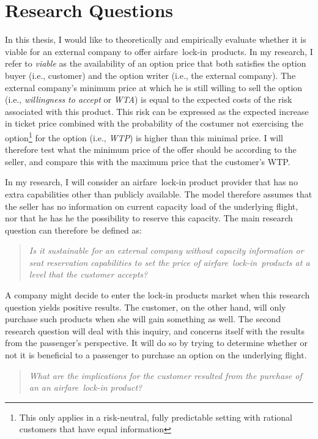 \chapter{Research Questions}
\label{chap:ResearchQuestions}
In this thesis, I would like to theoretically and empirically evaluate whether it is viable for an external company to offer airfare~lock-in~products. In my research, I refer to \emph{viable} as the availability of an option price that both satisfies the option buyer (i.e., customer) and the option writer (i.e., the external company). The external company's minimum price at which he is still willing to sell the option (i.e., \emph{willingness to accept} or \emph{WTA}) is equal to the expected costs of the risk associated with this product. This risk can be expressed as the expected increase in ticket price combined with the probability of the costumer not exercising the option\footnote{This only applies in a risk-neutral, fully predictable setting with rational customers that have equal information} for the option (i.e., \emph{WTP}) is higher than this minimal price. I will therefore test what the minimum price of the offer should be according to the seller, and compare this with the maximum price that the customer's WTP.

In my research, I will consider an airfare~lock-in product provider that has no extra capabilities other than publicly available. The model therefore assumes that the seller has no information on current capacity load of the underlying flight, nor that he has he the possibility to reserve this capacity. The main research question can therefore be defined as:

\begin{quote}\emph{Is it sustainable for an external company without capacity information or seat reservation capabilities to set the price of airfare~lock-in~products at a level that the customer accepts?}\end{quote}

A company might decide to enter the lock-in products market when this research question yields positive results. The customer, on the other hand, will only purchase such products when she will gain something as well. The second research question will deal with this inquiry, and concerns itself with the results from the passenger's perspective. It will do so by trying to determine whether or not it is beneficial to a passenger to purchase an option on the underlying flight.

\begin{quote}\emph{What are the implications for the customer resulted from the purchase of an an airfare~lock-in product?}\end{quote}

